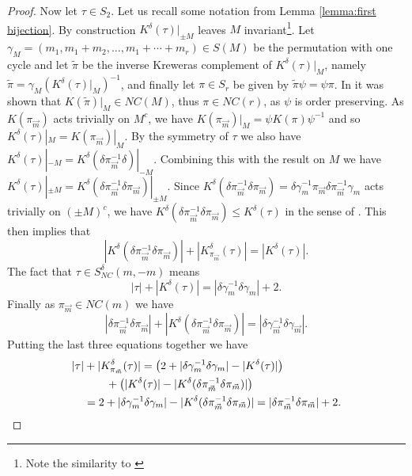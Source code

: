 \documentclass[11pt]{amsart}
\theoremstyle{definition}
\numberwithin{theorem}{section}
\newcommand{\sM}{{\scriptscriptstyle M}}
\newcommand{\NC}{\mathit{NC}}
\newcommand{\vm}{{\vec{m}}}
\newcommand{\ab}{\allowbreak}
\begin{document}
\begin{proof}
Now let $\tau \in S_2$. Let us recall some notation from
Lemma \ref{lemma:first bijection}. By construction
$K^\delta(\tau)|_{\pm M}$ leaves $M$ invariant\footnote{Note
the similarity to \cite[Lemma 20]{mst}}. Let $\gamma_\sM =
(m_1, m_1 + m_2, \dots,\ab m_1 + \cdots + m_r) \in S(M)$ be
the permutation with one cycle and let $\tilde\pi$ be the
inverse Kreweras complement of $K^\delta(\tau)|_\sM$, namely
$\tilde\pi = \gamma_\sM (K^\delta(\tau)|_\sM)^{-1}$, and
finally let $\pi \in S_r$ be given by $\tilde\pi\psi =
\psi\pi$. In \cite[Notation 4]{mst} it was shown that
$K(\tilde\pi)|_\sM \in \NC(M)$, thus $\pi \in \NC(r)$, as
$\psi$ is order preserving. As $K(\pi_\vm)$ acts trivially
on $M^c$, we have $K(\pi_\vm)|_\sM = \psi K(\pi) \psi^{-1}$
and so $K^\delta(\tau)|_\sM = K(\pi_\vm)|_\sM$. By the
symmetry of $\tau$ we also have $K^\delta(\tau)|_{-\sM} =
K^\delta(\delta\pi_\vm^{-1}\delta)|_{-\sM}$. Combining this
with the result on $M$ we have $K^\delta(\tau)|_{\pm\sM} =
K^\delta(\delta\pi_\vm^{-1}\delta \pi_\vm)|_{\pm
  \sM}$. Since $K^\delta(\delta\pi_\vm^{-1}\delta \pi_\vm) =
\delta \gamma_m^{-1} \pi_\vm \delta \pi_\vm^{-1} \gamma_m$
acts trivially on $(\pm M)^c$, we have $K^\delta(\delta
\pi_\vm^{-1} \delta \pi_\vm) \leq K^\delta(\tau)$ in the
sense of \cite[Notation 4]{mst}. This then implies that
\begin{equation*}\label{eq:relative complement}
|K^\delta(\delta \pi_\vm^{-1}\delta\pi_\vm)| + |K^\delta_{\pi_\vm}(\tau)| = |K^\delta(\tau)|.
\end{equation*}
The fact that $\tau \in S_\NC^\delta(m, -m)$ means
\begin{equation*}\label{eq:non-crossing tau}
|\tau| + |K^\delta(\tau)| = |\delta \gamma_m^{-1}\delta \gamma_m| + 2.
\end{equation*}
Finally as $\pi_\vm \in \NC(m)$ we have
\begin{equation*}\label{eq:non-crossing pi}
|\delta \pi_\vm^{-1} \delta \pi_\vm| + |K^\delta( \delta \pi_\vm^{-1} \delta \pi_\vm) | = |\delta \gamma_\vm^{-1} \delta \gamma_\vm|.
\end{equation*}
Putting the last three equations together we have
\begin{align}
|\tau| &   + |K^\delta_{\pi_\vm}(\tau)| = \big(2 + |\delta \gamma_m^{-1} \delta \gamma_m|  - |K^\delta(\tau)|\big) \\
&\qquad\mbox{} + \big(
|K^\delta(\tau)| - |K^\delta(\delta \pi_\vm^{-1} \delta \pi_\vm)| \big)\notag \\ 
& \mbox{} =
2 + |\delta \gamma_m^{-1} \delta \gamma_m| -  |K^\delta(\delta \pi_\vm^{-1} \delta \pi_\vm)| = |\delta \pi_\vm^{-1}\delta \pi_\vm| + 2. \notag
\end{align}


\end{proof}
\end{document}
